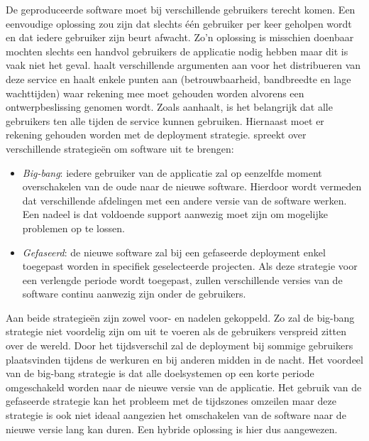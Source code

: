 De geproduceerde software moet bij verschillende gebruikers terecht komen.
Een eenvoudige oplossing zou zijn dat slechts één gebruiker per keer geholpen wordt en dat iedere gebruiker zijn beurt afwacht.
Zo'n oplossing is misschien doenbaar mochten slechts een handvol gebruikers de applicatie nodig hebben maar dit is vaak niet het geval.
\citet{patterson2008data} haalt verschillende argumenten aan voor het distribueren van deze service en haalt enkele punten aan (betrouwbaarheid, bandbreedte en lage wachttijden) waar rekening mee moet gehouden worden alvorens een ontwerpbeslissing genomen wordt.
Zoals \citet{patterson2008data} aanhaalt, is het belangrijk dat alle gebruikers ten alle tijden de service kunnen gebruiken.
Hiernaast moet er rekening gehouden worden met de deployment strategie.
\citet{munch2012software} spreekt over verschillende strategieën om software uit te brengen:
\begin{itemize}
\item \emph{Big-bang}: iedere gebruiker van de applicatie zal op eenzelfde moment overschakelen van de oude naar de nieuwe software. 
Hierdoor wordt vermeden dat verschillende afdelingen met een andere versie van de software werken. 
Een nadeel is dat voldoende support aanwezig moet zijn om mogelijke problemen op te lossen.
\item \emph{Gefaseerd}: de nieuwe software zal bij een gefaseerde deployment enkel toegepast worden in specifiek geselecteerde projecten.
Als deze strategie voor een verlengde periode wordt toegepast, zullen verschillende versies van de software continu aanwezig zijn onder de gebruikers.
\end{itemize}
Aan beide strategieën zijn zowel voor- en nadelen gekoppeld.
Zo zal de big-bang strategie niet voordelig zijn om uit te voeren als de gebruikers verspreid zitten over de wereld.
Door het tijdsverschil zal de deployment bij sommige gebruikers plaatsvinden tijdens de werkuren en bij anderen midden in de nacht.
Het voordeel van de big-bang strategie is dat alle doelsystemen op een korte periode omgeschakeld worden naar de nieuwe versie van de applicatie. 
Het gebruik van de gefaseerde strategie kan het probleem met de tijdszones omzeilen maar deze strategie is ook niet ideaal aangezien het omschakelen van de software naar de nieuwe versie lang kan duren.
Een hybride oplossing is hier dus aangewezen.


